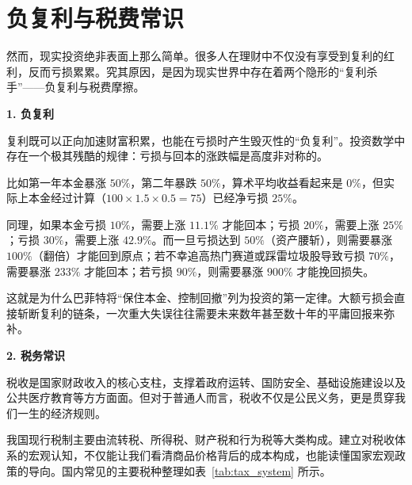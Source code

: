\documentclass[12pt,openany]{book}
\newcommand{\subhead}[1]{%
    \par\vspace{0.5\baselineskip}%
    \noindent\textbf{#1}\par%
    \vspace{0.5\baselineskip}%
}
\begin{document}
\section{负复利与税费常识}

然而，现实投资绝非表面上那么简单。很多人在理财中不仅没有享受到复利的红利，反而亏损累累。究其原因，是因为现实世界中存在着两个隐形的“复利杀手”——负复利与税费摩擦。

\subhead{1. 负复利}

复利既可以正向加速财富积累，也能在亏损时产生毁灭性的“负复利”。投资数学中存在一个极其残酷的规律：亏损与回本的涨跌幅是高度非对称的。

比如第一年本金暴涨 $50\%$，第二年暴跌 $50\%$，算术平均收益看起来是 $0\%$，但实际上本金经过计算（$100 \times 1.5 \times 0.5 = 75$）已经净亏损 $25\%$。

同理，如果本金亏损 $10\%$，需要上涨 $11.1\%$ 才能回本；亏损 $20\%$，需要上涨 $25\%$；亏损 $30\%$，需要上涨 $42.9\%$。而一旦亏损达到 $50\%$（资产腰斩），则需要暴涨 $100\%$（翻倍）才能回到原点；若不幸追高热门赛道或踩雷垃圾股导致亏损 $70\%$，需要暴涨 $233\%$ 才能回本；若亏损 $90\%$，则需要暴涨 $900\%$ 才能挽回损失。

这就是为什么巴菲特将“保住本金、控制回撤”列为投资的第一定律。大额亏损会直接斩断复利的链条，一次重大失误往往需要未来数年甚至数十年的平庸回报来弥补。

\subhead{2. 税务常识}

税收是国家财政收入的核心支柱，支撑着政府运转、国防安全、基础设施建设以及公共医疗教育等方方面面。但对于普通人而言，税收不仅是公民义务，更是贯穿我们一生的经济规则。

我国现行税制主要由流转税、所得税、财产税和行为税等大类构成。建立对税收体系的宏观认知，不仅能让我们看清商品价格背后的成本构成，也能读懂国家宏观政策的导向。国内常见的主要税种整理如表~\ref{tab:tax_system} 所示。
\end{document}
